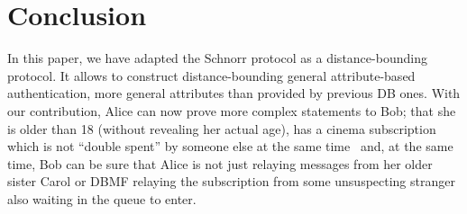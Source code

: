 \section{Conclusion}%
\label{Conclusion}

In this paper, we have adapted the Schnorr protocol as a
distance-bounding protocol.  It allows to construct distance-bounding
general attribute-based authentication, more general attributes than
provided by previous \ac{DB} ones.  With our contribution, Alice can
now prove more complex statements to Bob; \eg that she is older than 18 
(without revealing her actual age), has a cinema subscription which is not 
\enquote{double spent} by someone else at the same time~\cite[\eg][]{AnonPass} 
and, at the same time, Bob can be sure that Alice is not just relaying messages 
from her older sister Carol or \ac{DBMF} relaying the subscription from some 
unsuspecting stranger also waiting in the queue to enter.

